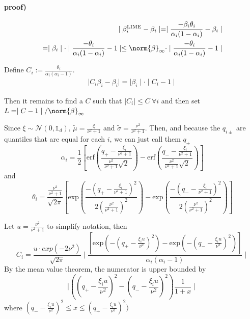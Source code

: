     \paragraph{proof)}
        \begin{align*}
            \mid \beta^{\text{LIME}}_i - \beta_i \mid = \mid \frac{-\beta_i \theta_i}{\alpha_i(1-\alpha_i)} -\beta_i \mid \\
            = \mid \beta_i \mid \cdot \mid \frac{-\theta_i}{\alpha_i(1-\alpha_i)} - 1 \mid \leq \norm{\beta}_\infty \cdot \mid \frac{-\theta_i}{\alpha_i(1-\alpha_i)} - 1 \mid
        \end{align*}

        Define $C_i := \frac{\theta_i}{\alpha_i(\alpha_i-1)}$.
        \begin{align*}
            \mid C_i \beta_i - \beta_i \mid = \mid \beta_i \mid \cdot \mid C_i - 1 \mid 
        \end{align*}

        Then it remains to find a $C$ such that $\mid C_i \mid \leq C\ \forall i$ and then set $L = \mid C-1\mid/\norm{\beta}_\infty$

        Since $\xi \sim \mathcal{N}(0,\mathds{1}_d)$, $\tilde{\mu} = \frac{\xi}{\nu^2+1}$ and $\tilde{\sigma} = \frac{\nu^2}{\nu^2+1}$. Then, and because the $q_{i\pm}$ are quantiles that are equal for each $i$, we can just call them $q_{\pm}$%
        \begin{equation*}
            \alpha_i = \frac{1}{2}\left[\text{erf} \left( \frac{q_{+}-\frac{\xi_i}{\nu^2+1}}{\frac{\nu^2}{\nu^2+1}\sqrt{2}} \right) - \text{erf} \left( \frac{q_{-}-\frac{\xi_i}{\nu^2+1}}{\frac{\nu^2}{\nu^2+1}\sqrt{2}} \right) \right]
        \end{equation*}
        and
        \begin{equation*}
            \theta_i = \frac{\frac{\nu^2}{\nu^2+1}}{\sqrt{2\pi}}\left[\text{exp}\left(\frac{-(q_+ -\frac{\xi_i}{\nu^2+1})^2}{2(\frac{\nu^2}{\nu^2+1})^2}\right) - \text{exp}\left(\frac{-(q_- -\frac{\xi_i}{\nu^2+1})^2}{2(\frac{\nu^2}{\nu^2+1})^2}\right)\right]
        \end{equation*}

        Let $u = \frac{\nu^2}{\nu^2+1}$ to simplify notation, then
        \begin{equation*}
            C_i = \frac{u\cdot exp(-2\nu^2)}{\sqrt{2\pi}}\mid \frac{\left[\text{exp}\left(-(q_+-\frac{\xi_i u}{\nu^2})^2\right) - \text{exp}\left(-(q_- -\frac{\xi_i u}{\nu^2})^2\right)\right]}{\alpha_i(\alpha_i-1)} \mid
        \end{equation*}
        By the mean value theorem, the numerator is upper bounded by 
        \begin{equation*}
            \mid ((q_+-\frac{\xi_i u}{\nu^2})^2 - (q_--\frac{\xi_i u}{\nu^2})^2) \frac{1}{1 + x} \mid
        \end{equation*}
        where $(q_--\frac{\xi_i u}{\nu^2})^2 \leq x \leq (q_+-\frac{\xi_i u}{\nu^2})^2)$

